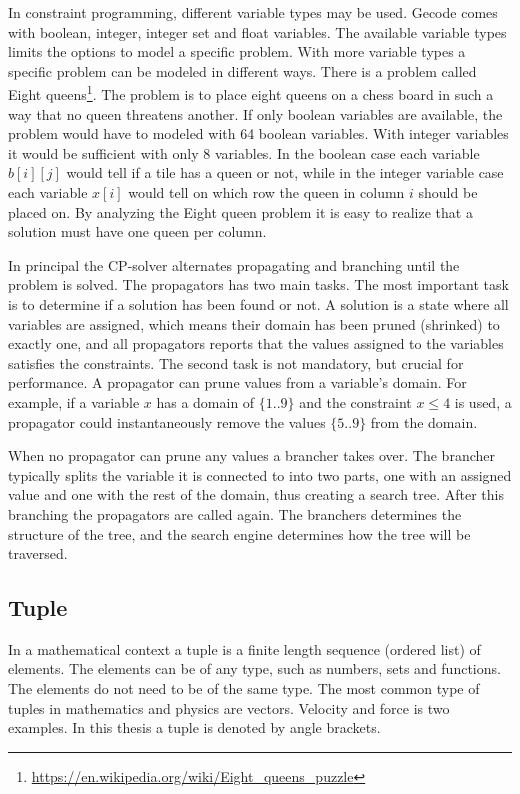 \documentclass[a4paper,11pt]{article}
\begin{document}
In constraint programming, different variable types may be used. Gecode comes with boolean, integer, integer set and float variables. The available variable types limits the options to model a specific problem. With more variable types a specific problem can be modeled in different ways. There is a problem called Eight queens\footnote{\url{https://en.wikipedia.org/wiki/Eight_queens_puzzle}}. The problem is to place eight queens on a chess board in such a way that no queen threatens another. If only boolean variables are available, the problem would have to modeled with 64 boolean variables. With integer variables it would be sufficient with only 8 variables. In the boolean case each variable $b[i][j]$ would tell if a tile has a queen or not, while in the integer variable case each variable $x[i]$ would tell on which row the queen in column $i$ should be placed on. By analyzing the Eight queen problem it is easy to realize that a solution must have one queen per column.

In principal the CP-solver alternates propagating and branching until the problem is solved. The propagators has two main tasks. The most important task is to determine if a solution has been found or not. A solution is a state where all variables are assigned, which means their domain has been pruned (shrinked) to exactly one, and all propagators reports that the values assigned to the variables satisfies the constraints. The second task is not mandatory, but crucial for performance. A propagator can prune values from a variable's domain. For example, if a variable $x$ has a domain of $\{1..9\}$ and the constraint $x\le 4$ is used, a propagator could instantaneously remove the values $\{5..9\}$ from the domain.

When no propagator can prune any values a brancher takes over. The brancher typically splits the variable it is connected to into two parts, one with an assigned value and one with the rest of the domain, thus creating a search tree. After this branching the propagators are called again. The branchers determines the structure of the tree, and the search engine determines how the tree will be traversed. 
\subsection{Tuple}
In a mathematical context a tuple is a finite length sequence (ordered list) of elements. The elements can be of any type, such as numbers, sets and functions. The elements do not need to be of the same type. The most common type of tuples in mathematics and physics are vectors. Velocity and force is two examples. In this thesis a tuple is denoted by angle brackets. 
\end{document}
